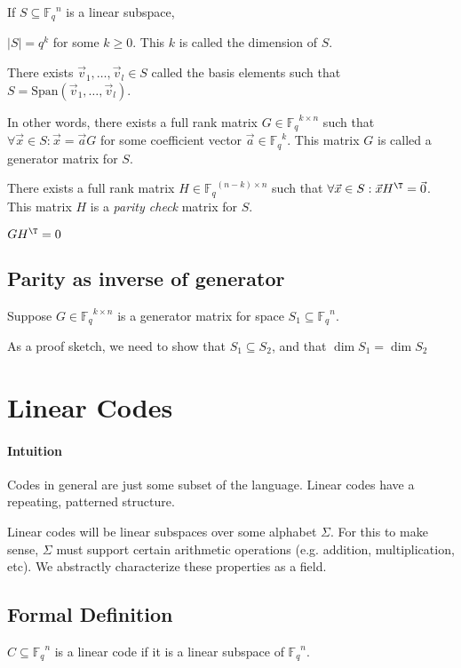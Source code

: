 \documentclass{idc_msc}
\newcommand{\Fq}{{\mathbb{F}_q}}
\begin{document}
If \(S \subseteq \Fq^n\) is a linear subspace,

\(|S|=q^k\) for some \(k \ge 0\). This \(k\) is called the dimension of \(S\).

There exists \(\vec{v}_1, \ldots, \vec{v}_l \in S\) called the basis elements such that \(S = \text{Span}(\vec{v}_1,\ldots,\vec{v}_l)\).

In other words, there exists a full rank matrix \(G \in \Fq^{k \times n}\) such that \(\forall \vec{x} \in S : \vec{x} = \vec{a} G\) for some coefficient vector \(\vec{a} \in \Fq^k\). This matrix \(G\) is called a generator matrix for \(S\).

There exists a full rank matrix \(H \in \Fq^{(n-k)\times n}\) such that \(\forall \vec{x} \in S : \vec{x} H^\T= \vec{0}\).
This matrix \(H\) is a \emph{parity check} matrix for \(S\).

\(GH^\T = 0\)

\subsection{Parity as inverse of generator}

Suppose \(G \in \Fq^{k \times n}\) is a generator matrix for space \(S_1 \subseteq \Fq^n\).

As a proof sketch, we need to show that \(S_1 \subseteq S_2\), and that \(\dim S_1 = \dim S_2\)


\clearpage
\section{Linear Codes}

\paragraph{Intuition}

Codes in general are just some subset of the language.
Linear codes have a repeating, patterned structure.

Linear codes will be linear subspaces over some alphabet \(\Sigma\).
For this to make sense, \(\Sigma\) must support certain arithmetic operations (e.g. addition, multiplication, etc).
We abstractly characterize these properties as a field.

\subsection{Formal Definition}

\(C \subseteq \Fq^n\) is a linear code if it is a linear subspace of \(\Fq^n\).
\end{document}
